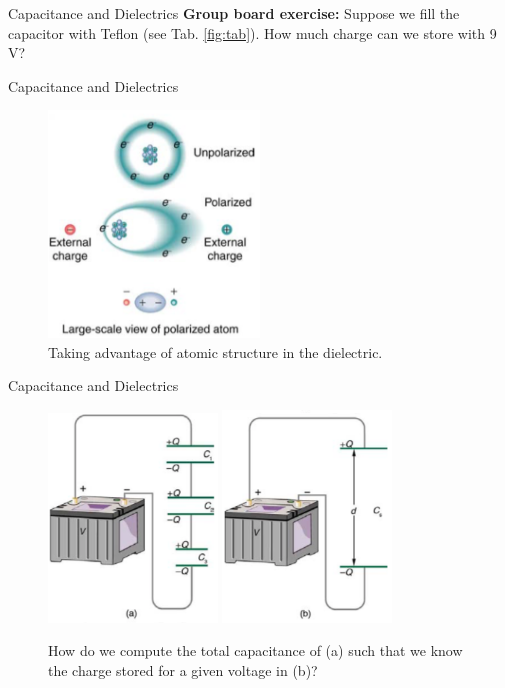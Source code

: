 \documentclass{beamer}
\begin{document}
\begin{frame}{Capacitance and Dielectrics}
\textbf{Group board exercise:} Suppose we fill the capacitor with Teflon (see Tab. \ref{fig:tab}).  How much charge can we store with 9 V?
\end{frame}

\begin{frame}{Capacitance and Dielectrics}
\begin{figure}
\centering
\includegraphics[width=0.5\textwidth]{figures/polar2.png}
\caption{\label{fig:polar2} Taking advantage of atomic structure in the dielectric.}
\end{figure}
\end{frame}

\begin{frame}{Capacitance and Dielectrics}
\begin{figure}
\centering
\includegraphics[width=0.4\textwidth]{figures/cap1.png} \hspace{0.2cm}
\includegraphics[width=0.4\textwidth]{figures/cap2.png}
\caption{\label{fig:cap} How do we compute the total capacitance of (a) such that we know the charge stored for a given voltage in (b)?}
\end{figure}
\end{frame}
\end{document}
